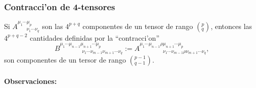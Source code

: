 \subsubsection{Contracci'on de 4-tensores}
 Si $A^{\mu_1 \cdots\mu_p}_{\ \ \ \ \ \ \ \
\nu_1\cdots\nu_q}$ son las $4^{p+q}$ componentes de un tensor de rango $(^p_q)$, entonces las $4^{p+q-2}$ cantidades definidas por la ``contracci'on''
\begin{equation}
B^{\mu_1 \cdots\mu_{n-1}\mu_{n+1}\cdots\mu_p}_{\ \ \ \ \ \ \ \ \ \ \ \ \ \ \ \ \ \ \ \ \nu_1\cdots\nu_{m-1}\nu_{m+1}\cdots\nu_q}:=A^{\mu_1
\cdots\mu_{n-1}\rho\mu_{n+1}\cdots\mu_p}_{\ \ \ \ \ \ \ \ \ \ \ \ \ \ \ \ \ \ \
\ \ \nu_1\cdots\nu_{m-1}\rho\nu_{m+1}\cdots\nu_q},
\end{equation}
son componentes de un tersor de rango $(^{p-1}_{q-1})$.

\paragraph{Observaciones:}


